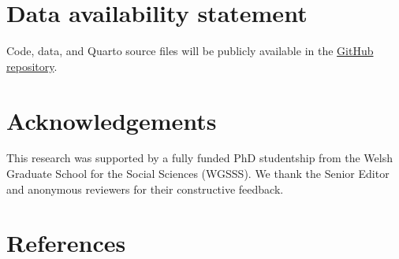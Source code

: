 \documentclass[
  11pt,
  authoryear,
  doubleblind,
  3p]{elsarticle}
\begin{document}
\section*{Data availability statement}\label{reproducibility}

Code, data, and Quarto source files will be publicly available in the
\href{https://github.com/chamara7h/Estimating-censored-demand-in-family-planning-supply-chains}{GitHub
repository}.

\section*{Acknowledgements}\label{acknowledgements}

This research was supported by a fully funded PhD studentship from the
Welsh Graduate School for the Social Sciences (WGSSS). We thank the
Senior Editor and anonymous reviewers for their constructive feedback.

\section*{References}\label{references}

\renewcommand{\bibsection}{}

\end{document}
